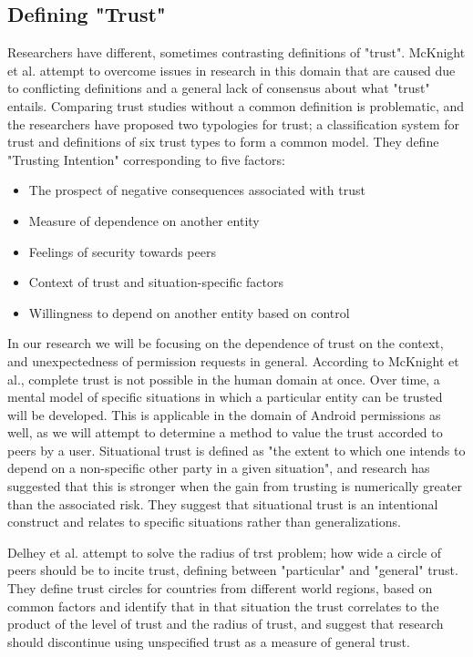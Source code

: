 \subsection{Defining "Trust"}
Researchers have different, sometimes contrasting definitions of "trust". McKnight et al. attempt to overcome issues in research in this domain that are caused due to conflicting definitions and a general lack of consensus about what "trust" entails. Comparing trust studies without a common definition is problematic, and the researchers have proposed two typologies for trust; a classification system for trust and definitions of six trust types to form a common model\cite{mcknight1996meanings}. They define "Trusting Intention" corresponding to five factors:
\begin{itemize}
\item The prospect of negative consequences associated with trust
\item Measure of dependence on another entity
\item Feelings of security towards peers 
\item Context of trust and situation-specific factors
\item Willingness to depend on another entity based on control
\end{itemize}
In our research we will be focusing on the dependence of trust on the context, and unexpectedness of permission requests in general. According to McKnight et al., complete trust is not possible in the human domain at once. Over time, a mental model of specific situations in which a particular entity can be trusted will be developed. This is applicable in the domain of Android permissions as well, as we will attempt to determine a method to value the trust accorded to peers by a user. Situational trust is defined as "the extent to which one intends to depend on a non-specific other party in a given situation", and research has suggested that this is stronger when the gain from trusting is numerically greater than the associated risk\cite{kee1970conceptual}. They suggest that situational trust is an intentional construct and relates to specific situations rather than generalizations. 
\smallskip

Delhey et al. attempt to solve the radius of trst problem; how wide a circle of peers should be to incite trust, defining between "particular" and "general" trust\cite{delhey2011general}. They define trust circles for countries from different world regions, based on common factors and identify that in that situation the trust correlates to the product of the level of trust and the radius of trust, and suggest that research should discontinue using unspecified trust as a measure of general trust.

